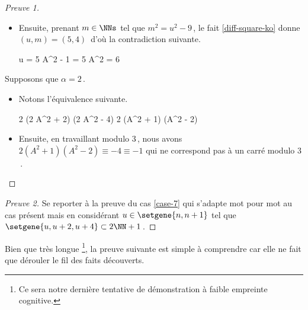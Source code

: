 \begin{proof}[Preuve 1]
\begin{itemize}
		\item Ensuite, prenant $m \in \NNs$ tel que $m^2 = u^2 - 9$\,, le fait \ref{diff-square-ko} donne $(u, m) = (5, 4)$\, d'où la contradiction suivante.
        
        \noindent\kern-6pt%
        \begin{stepcalc}[style=sar, ope=\iff]
        	u = 5
    	\explnext{}
        	A^2 - 1 = 5
        	A^2 = 6
        \end{stepcalc}
    \end{itemize}
    
    \medskip
    
	Supposons que $\alpha = 2$\,.
    \begin{itemize}
    	\item Notons l'équivalence suivante.
        
        \noindent\kern-6pt%
        \begin{stepcalc}[style=ar*, ope=\iff]
        	2 (2 A^2 + 2) (2 A^2 - 4) \in \NNssquare
        	2 (A^2 + 1) (A^2 - 2) \in \NNssquare
        \end{stepcalc}

		\item Ensuite, en travaillant modulo $3$\,, nous avons
		$2 (A^2 + 1) (A^2 - 2) \equiv -4 \equiv -1$ qui ne correspond pas à un carré modulo $3$\,.
		\qedhere 
    \end{itemize}   
\end{proof}



	
\begin{proof}[Preuve 2]
	Se reporter à la preuve du cas \ref{case-7} qui s'adapte mot pour mot au cas présent mais en considérant $u \in \setgene{n, n+1}$ tel que $\setgene{u, u + 2, u + 4} \subset 2 \NN + 1$\,.
\end{proof}




Bien que très longue
\footnote{
	Ce sera notre dernière tentative de démonstration à faible empreinte cognitive.
},
la preuve suivante est simple à comprendre car elle ne fait que dérouler le fil des faits découverts.

